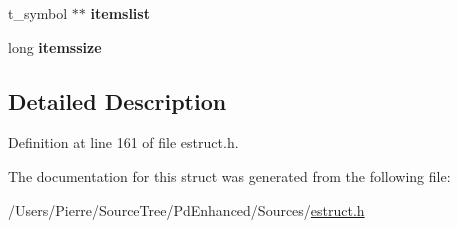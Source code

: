 \begin{DoxyCompactItemize}
\item 
\hypertarget{struct__eattr_a8d196437fdcc2bd7fae8c1d8715bfcd2}{t\-\_\-symbol $\ast$$\ast$ {\bfseries itemslist}}\label{struct__eattr_a8d196437fdcc2bd7fae8c1d8715bfcd2}

\item 
\hypertarget{struct__eattr_a8beb98feff626231b8525e20c7157163}{long {\bfseries itemssize}}\label{struct__eattr_a8beb98feff626231b8525e20c7157163}

\end{DoxyCompactItemize}


\subsection{Detailed Description}


Definition at line 161 of file estruct.\-h.



The documentation for this struct was generated from the following file\-:\begin{DoxyCompactItemize}
\item 
/\-Users/\-Pierre/\-Source\-Tree/\-Pd\-Enhanced/\-Sources/\hyperlink{estruct_8h}{estruct.\-h}\end{DoxyCompactItemize}
